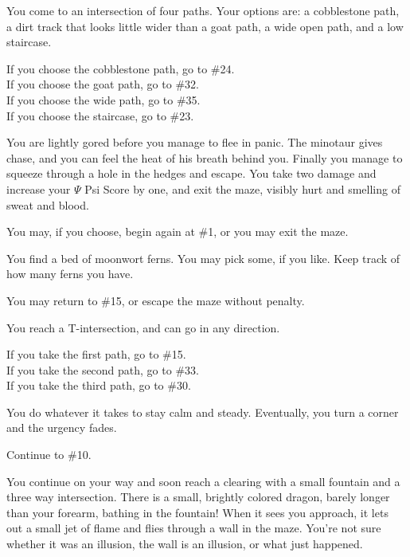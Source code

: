 \documentclass[white]{gl2018}
\begin{document}
\begin{large}
\begin{location}{10}
You come to an intersection of four paths.  Your options are: a cobblestone path, a dirt track that looks little wider than a goat path, a wide open path, and a low staircase.  

\begin{fromhere}
If you choose the cobblestone path, go to \#24.\\
  If you choose the goat path, go to \#32.\\
  If you choose the wide path, go to \#35.\\
  If you choose the staircase, go to \#23.
\end{fromhere}
\end{location}
\begin{location}{11}
You are lightly gored before you manage to flee in panic.  The minotaur gives chase, and you can feel the heat of his breath behind you.  Finally you manage to squeeze through a hole in the hedges and escape.  You take two damage and increase your $\Psi$ Psi Score by one, and exit the maze, visibly hurt and smelling of sweat and blood.  
\begin{fromhere}
You may, if you choose, begin again at \#1, or you may exit the maze.
\end{fromhere}
\end{location}
\begin{location}{12}
You find a bed of moonwort ferns.  You may pick some, if you like.  Keep track of how many ferns you have.

\begin{fromhere}
You may return to \#15, or escape the maze without penalty.
\end{fromhere} 
\end{location}
\begin{location}{13}
You reach a T-intersection, and can go in any direction.
\begin{fromhere}
  If you take the first path, go to \#15.\\
 If you take the second path, go to \#33.\\
 If you take the third path, go to \#30.
\end{fromhere}
\end{location}
\begin{location}{14}
You do whatever it takes to stay calm and steady.  Eventually, you turn a corner and the urgency fades. 
\begin{fromhere}Continue to \#10.\end{fromhere}\end{location}
\begin{location}{15}
You continue on your way and soon reach a clearing with a small fountain and a three way intersection.  There is a small, brightly colored dragon, barely longer than your forearm, bathing in the fountain!  When it sees you approach, it lets out a small jet of flame and flies through a wall in the maze.  You're not sure whether it was an illusion, the wall is an illusion, or what just happened.


\end{location}
\end{large}
\end{document}
